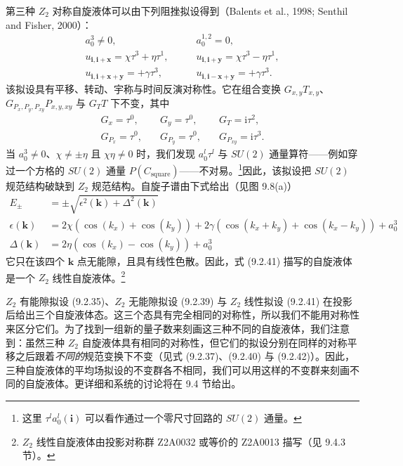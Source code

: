 第三种 $Z_2$ 对称自旋液体可以由下列阻挫拟设得到（Balents et al., 1998; Senthil and Fisher, 2000）：
\begin{align*}
a_0^{3}\neq 0,\qquad & a_0^{1,2}=0,\\
u_{\pmb{i},\pmb{i}+\pmb{x}}=\chi\tau^{3}+\eta\tau^{1},\qquad & u_{\pmb{i},\pmb{i}+\pmb{y}}=\chi\tau^{3}-\eta\tau^{1},\\
u_{\pmb{i},\pmb{i}+\pmb{x}+\pmb{y}}=+\gamma\tau^{3},\qquad & u_{\pmb{i},\pmb{i}-\pmb{x}+\pmb{y}}=+\gamma\tau^{3}.
\tag{9.2.41}
\end{align*}
该拟设具有平移、转动、宇称与时间反演对称性。它在组合变换 $G_{x,y}T_{x,y}$、$G_{P_x,P_y,P_{xy}}P_{x,y,xy}$ 与 $G_TT$ 下不变，其中
\begin{equation*}
\begin{array}{ccc}
G_x=\tau^{0}, & \quad G_y=\tau^{0}, & \quad G_T=\mathrm{i}\tau^{2},\\
G_{P_x}=\tau^{0}, & \quad G_{P_y}=\tau^{0}, & \quad G_{P_{xy}}=\mathrm{i}\tau^{3}.
\end{array}
\tag{9.2.42}
\end{equation*}
当 $a_0^{3}\neq 0$、$\chi\neq\pm\eta$ 且 $\chi\eta\neq 0$ 时，我们发现 $a_0^{l}\tau^{l}$ 与 $SU(2)$ 通量算符——例如穿过一个方格的 $SU(2)$ 通量 $P(C_{\mathrm{square}})$——不对易。\footnote{这里 $\tau^{l}a_0^{l}(\pmb{i})$ 可以看作通过一个零尺寸回路的 $SU(2)$ 通量。}因此，该拟设把 $SU(2)$ 规范结构破缺到 $Z_2$ 规范结构。自旋子谱由下式给出（见图 9.8(a)）
\begin{align*}
E_{\pm}&=\pm\sqrt{\epsilon^{2}(\pmb{k})+\Delta^{2}(\pmb{k})}\\
\epsilon(\pmb{k})&=2\chi(\cos(k_x)+\cos(k_y))+2\gamma(\cos(k_x+k_y)+\cos(k_x-k_y))+a_0^{3}\\
\Delta(\pmb{k})&=2\eta(\cos(k_x)-\cos(k_y))+a_0^{3}
\end{align*}
它只在该四个 $\pmb{k}$ 点无能隙，且具有线性色散。因此，式 (9.2.41) 描写的自旋液体是一个 $Z_2$ 线性自旋液体。\footnote{$Z_2$ 线性自旋液体由投影对称群 Z2A0032 或等价的 Z2A0013 描写（见 9.4.3 节）。}

$Z_2$ 有能隙拟设 (9.2.35)、$Z_2$ 无能隙拟设 (9.2.39) 与 $Z_2$ 线性拟设 (9.2.41) 在投影后给出三个自旋液体态。这三个态具有完全相同的对称性，所以我们不能用对称性来区分它们。为了找到一组新的量子数来刻画这三种不同的自旋液体，我们注意到：虽然三种 $Z_2$ 自旋液体具有相同的对称性，但它们的拟设分别在同样的对称平移之后跟着\emph{不同的}规范变换下不变（见式 (9.2.37)、(9.2.40) 与 (9.2.42)）。因此，三种自旋液体的平均场拟设的不变群各不相同，我们可以用这样的不变群来刻画不同的自旋液体。更详细和系统的讨论将在 9.4 节给出。

